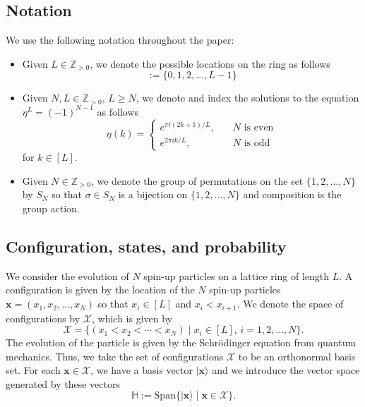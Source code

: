 \documentclass[a4paper,11pt]{article}
\theoremstyle{definition}
\begin{document}
\subsection{Notation}

We use the following notation throughout the paper:

\begin{itemize}
    \item Given $L \in \mathbb{Z}_{>0}$, we denote the possible locations on the ring as follows
    \begin{equation}
    [L] := \{0, 1, 2 , \dots, L-1 \}
    \end{equation}

    \item Given $N, L \in \mathbb{Z}_{>0}$, $L\geq N$, we denote and index the solutions to the equation $\eta^L = (-1)^{N-1}$ as follows
    \begin{equation}\label{e:roots_special}
        \eta(k) = \begin{cases}
            e^{\pi i (2 k +1)/L}, &\quad N \text{ is even}\\
            e^{2 \pi i k/L}, &\quad N \text{ is odd}
        \end{cases}
    \end{equation}
    for $k \in [L]$.

    \item Given $N\in \mathbb{Z}_{>0}$, we denote the group of permutations on the set $\{1, 2, \dots, N\}$ by $S_N$ so that $\sigma \in S_N$ is a bijection on $\{1, 2, \dots, N\}$ and composition is the group action.
    
\end{itemize}

\subsection{Configuration, states, and probability}\label{s:configuration}

We consider the evolution of $N$ spin-up particles on a lattice ring of length $L$. A configuration is given by the location of the $N$ spin-up particles $\mathbf{x} = (x_1, x_2, \dots, x_N)$ so that $x_i \in [L]$ and $x_i < x_{i+1}$. We denote the space of configurations by $\mathcal{X}$, which is given by
\begin{equation}\label{e:coordinate_config}
    \mathcal{X} = \{(x_1 < x_2 < \cdots < x_N) \mid x_i \in [L], \, i=1, 2, \dots, N \}.
\end{equation}
The evolution of the particle is given by the Schr\"odinger equation from quantum mechanics. Thus, we take the set of configurations $\mathcal{X}$ to be an orthonormal basis set. For each $\mathbf{x} \in \mathcal{X}$, we have a basis vector $| \mathbf{x} \rangle$ and we introduce the vector space generated by these vectors
\begin{equation}\label{e:config_space}
    \mathbb{H}:= \mathrm{Span}\{|\mathbf{x}\rangle \mid \mathbf{x} \in \mathcal{X}\}.
\end{equation}
\end{document}
